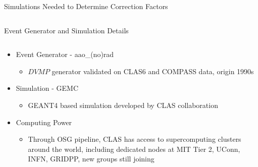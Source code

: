 \documentclass[aspectratio=169]{beamer}
\begin{document}
\begin{frame}{Simulations Needed to Determine Correction Factors}
\begin{columns}
                                          
                               
                       

                                          
                        
                           
                                          
                    \end{columns}
  
\end{frame}





\begin{frame}{Event Generator and Simulation Details}
     \begin{columns}[c]
               \begin{column}{0.5\textwidth}

                    \begin{itemize}
                        \item Event Generator - aao\_(no)rad
                            \begin{itemize}
                                \item  $DVMP$ generator validated on CLAS6 and COMPASS data, origin 1990s
                            \end{itemize}
                        \item Simulation - GEMC
                            \begin{itemize}
                                \item GEANT4 based simulation developed by CLAS collaboration
                            \end{itemize}
                        \item Computing Power
                            \begin{itemize}
                                \item Through OSG pipeline, CLAS has access to supercomputing clusters around the world, including dedicated nodes at MIT Tier 2, UConn, INFN, GRIDPP, new groups still joining
                            \end{itemize}
                    \end{itemize}
                    \end{column}
                    

\end{columns}
\end{frame}
\end{document}
